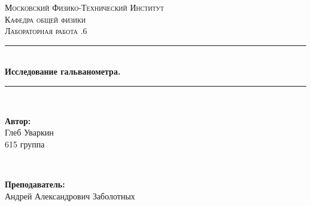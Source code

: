 \documentclass[a4paper, 12pt, twoside]{article}
\begin{document}
\begin{titlepage}

\newcommand{\HRule}{\rule{\linewidth}{0.7mm}} %

\center %
 

\textsc{\LARGE Московский Физико-Технический Институт}\\[1,5cm] %
\textsc{\Large Кафедра общей физики}\\[0.5cm] %
\textsc{\large Лабораторная работа .6}\\[0.5cm] %


\HRule
\\[0.4cm]
{ \huge \bfseries Исследование гальванометра.}
\\[0.2cm] %
\HRule
\\[1.5cm]


 

\begin{minipage}{0.4\textwidth}
	\begin{flushleft} \large
		\textbf{Автор:}\\
		Глеб Уваркин \\
		615 группа
	\end{flushleft}
\end{minipage}
~
\begin{minipage}{0.4\textwidth}
	\begin{flushright} \large
		\textbf {Преподаватель:} \\
		Андрей Александрович Заболотных %
	\end{flushright}
\end{minipage}


\end{titlepage}
\end{document}
